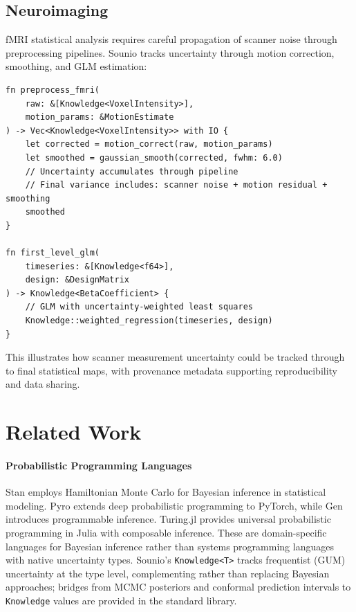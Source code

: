\documentclass[11pt,a4paper]{article}
\begin{document}
\subsection{Neuroimaging}

fMRI statistical analysis requires careful propagation of scanner noise
through preprocessing pipelines. Sounio tracks uncertainty through motion
correction, smoothing, and GLM estimation:

\begin{lstlisting}[caption={fMRI preprocessing with uncertainty}]
fn preprocess_fmri(
    raw: &[Knowledge<VoxelIntensity>],
    motion_params: &MotionEstimate
) -> Vec<Knowledge<VoxelIntensity>> with IO {
    let corrected = motion_correct(raw, motion_params)
    let smoothed = gaussian_smooth(corrected, fwhm: 6.0)
    // Uncertainty accumulates through pipeline
    // Final variance includes: scanner noise + motion residual + smoothing
    smoothed
}

fn first_level_glm(
    timeseries: &[Knowledge<f64>],
    design: &DesignMatrix
) -> Knowledge<BetaCoefficient> {
    // GLM with uncertainty-weighted least squares
    Knowledge::weighted_regression(timeseries, design)
}
\end{lstlisting}

This illustrates how scanner measurement uncertainty could be tracked
through to final statistical maps, with provenance metadata supporting
reproducibility and data sharing.

\section{Related Work}
\label{sec:related}

\paragraph{Probabilistic Programming Languages}
Stan \citep{carpenter2017stan} employs Hamiltonian Monte Carlo for Bayesian
inference in statistical modeling. Pyro \citep{bingham2019pyro} extends deep
probabilistic programming to PyTorch, while Gen \citep{cusumano2019gen}
introduces programmable inference. Turing.jl \citep{ge2018turing} provides
universal probabilistic programming in Julia with composable inference.
These are domain-specific languages for
Bayesian inference rather than systems programming languages with native
uncertainty types. Sounio's \texttt{Knowledge<T>} tracks frequentist (GUM)
uncertainty at the type level, complementing rather than replacing Bayesian
approaches; bridges from MCMC posteriors and conformal prediction intervals
to \texttt{Knowledge} values are provided in the standard library.
\end{document}
